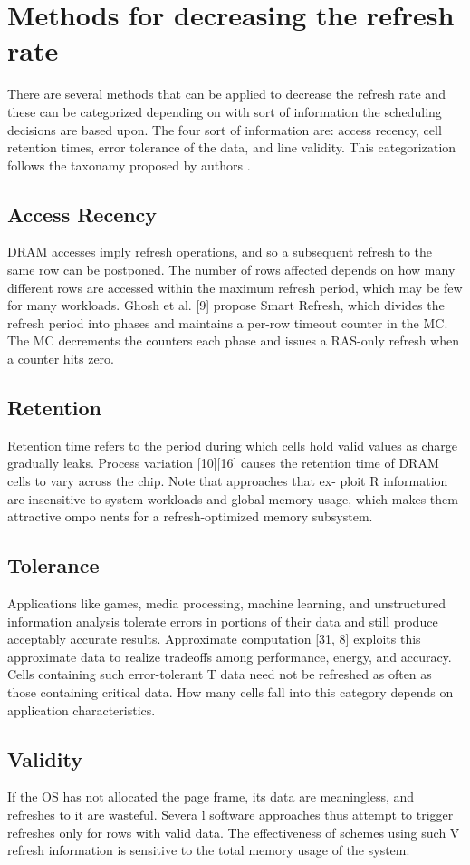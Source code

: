 \section{Methods for decreasing the refresh rate} 
\label{sec:met}
There are several methods that can be applied to decrease the refresh rate and these can be categorized depending on with sort of information the scheduling decisions are based upon. The four sort of information are: access recency, cell retention times, error tolerance of the data, and line validity. This categorization follows the taxonamy proposed by authors \cite{dtail}. 
\subsection{Access Recency}
DRAM accesses imply refresh operations, and so a subsequent refresh to the same row can be postponed. The number of rows affected depends on how many different rows are accessed within the maximum refresh period, which may be few for many workloads. Ghosh et al. [9] propose Smart Refresh, which divides the refresh period into phases and maintains a per-row timeout counter in the MC. The MC decrements the counters each phase and issues a RAS-only refresh when a counter hits zero.


\subsection{Retention}
Retention time refers to the period during which cells hold valid values as charge gradually leaks. Process variation [10][16] causes the retention time of DRAM cells to vary across the chip. Note that approaches that ex-
ploit R information are insensitive to system workloads and global memory usage, which makes them attractive ompo
nents for a refresh-optimized memory subsystem.

\subsection{Tolerance}
Applications like games, media processing, machine learning, and unstructured information analysis tolerate errors in portions of their data and still produce acceptably accurate results. Approximate computation [31, 8] exploits this approximate data to realize tradeoffs among performance, energy, and accuracy. Cells containing such error-tolerant T data need not be refreshed as often as those containing critical data. How many cells fall into this category depends on application characteristics.

\subsection{Validity}
If the OS has not allocated the page frame, its data are meaningless, and refreshes to it are wasteful. Severa
l software approaches thus attempt to trigger refreshes only for rows with valid data. The effectiveness of schemes using such V refresh information is sensitive to the total memory usage of the system.